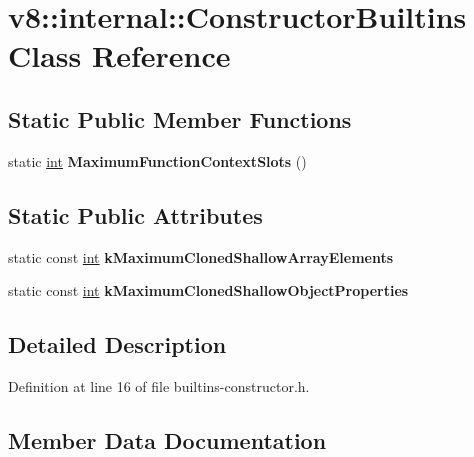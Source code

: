 \hypertarget{classv8_1_1internal_1_1ConstructorBuiltins}{}\section{v8\+:\+:internal\+:\+:Constructor\+Builtins Class Reference}
\label{classv8_1_1internal_1_1ConstructorBuiltins}
\subsection*{Static Public Member Functions}
\begin{DoxyCompactItemize}
\item 
\mbox{\label{classv8_1_1internal_1_1ConstructorBuiltins_a8f1a5f8ee1086234d878809b1781a61d}} 
static \mbox{\hyperlink{classint}{int}} {\bfseries Maximum\+Function\+Context\+Slots} ()
\end{DoxyCompactItemize}
\subsection*{Static Public Attributes}
\begin{DoxyCompactItemize}
\item 
static const \mbox{\hyperlink{classint}{int}} {\bfseries k\+Maximum\+Cloned\+Shallow\+Array\+Elements}
\item 
static const \mbox{\hyperlink{classint}{int}} {\bfseries k\+Maximum\+Cloned\+Shallow\+Object\+Properties}
\end{DoxyCompactItemize}


\subsection{Detailed Description}


Definition at line 16 of file builtins-\/constructor.\+h.



\subsection{Member Data Documentation}
\mbox{\label{classv8_1_1internal_1_1ConstructorBuiltins_a8814947d37442eeda239901da31a4211}} 
